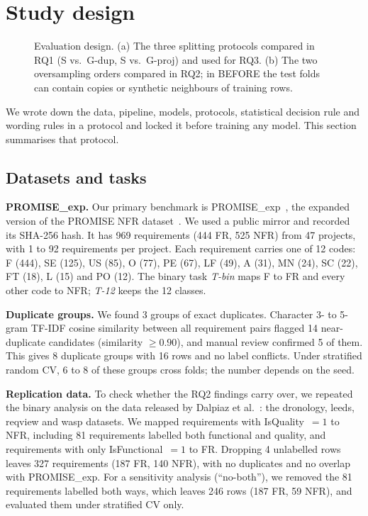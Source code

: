 \section{Study design}
\label{sec:method}

\begin{figure}[t]
\centering
\resizebox{\textwidth}{!}{}
\caption{Evaluation design. (a) The three splitting protocols compared in RQ1 (S vs.\ G-dup, S vs.\ G-proj) and used for RQ3. (b) The two oversampling orders compared in RQ2; in BEFORE the test folds can contain copies or synthetic neighbours of training rows.}
\label{fig:design}
\end{figure}

We wrote down the data, pipeline, models, protocols, statistical decision rule and wording rules in a protocol and locked it before training any model. This section summarises that protocol.

\subsection{Datasets and tasks}

\textbf{PROMISE\_exp.} Our primary benchmark is PROMISE\_exp~\cite{lima2019}, the expanded version of the PROMISE NFR dataset~\cite{clelandhuang2007}. We used a public mirror and recorded its SHA-256 hash. It has 969 requirements (444 FR, 525 NFR) from 47 projects, with 1 to 92 requirements per project. Each requirement carries one of 12 codes: F (444), SE (125), US (85), O (77), PE (67), LF (49), A (31), MN (24), SC (22), FT (18), L (15) and PO (12). The binary task \emph{T-bin} maps F to FR and every other code to NFR; \emph{T-12} keeps the 12 classes.

\textbf{Duplicate groups.} We found 3 groups of exact duplicates. Character 3- to 5-gram TF-IDF cosine similarity between all requirement pairs flagged 14 near-duplicate candidates (similarity $\geq 0.90$), and manual review confirmed 5 of them. This gives 8 duplicate groups with 16 rows and no label conflicts. Under stratified random CV, 6 to 8 of these groups cross folds; the number depends on the seed.

\textbf{Replication data.} To check whether the RQ2 findings carry over, we repeated the binary analysis on the data released by Dalpiaz et al.~\cite{dalpiaz2019,dalpiaz2019data}: the dronology, leeds, reqview and wasp datasets. We mapped requirements with IsQuality~$=1$ to NFR, including 81 requirements labelled both functional and quality, and requirements with only IsFunctional~$=1$ to FR. Dropping 4 unlabelled rows leaves 327 requirements (187 FR, 140 NFR), with no duplicates and no overlap with PROMISE\_exp. For a sensitivity analysis (``no-both''), we removed the 81 requirements labelled both ways, which leaves 246 rows (187 FR, 59 NFR), and evaluated them under stratified CV only.

